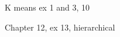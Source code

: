\documentclass{article}
\begin{document}
	K means ex 1 and 3, 10

	Chapter 12, ex 13, hierarchical \\ 

	\cite{hastie01statisticallearning}
	
	
	\newpage
	
	\printbibliography

%	
%	
%	
%	
	
\end{document}
